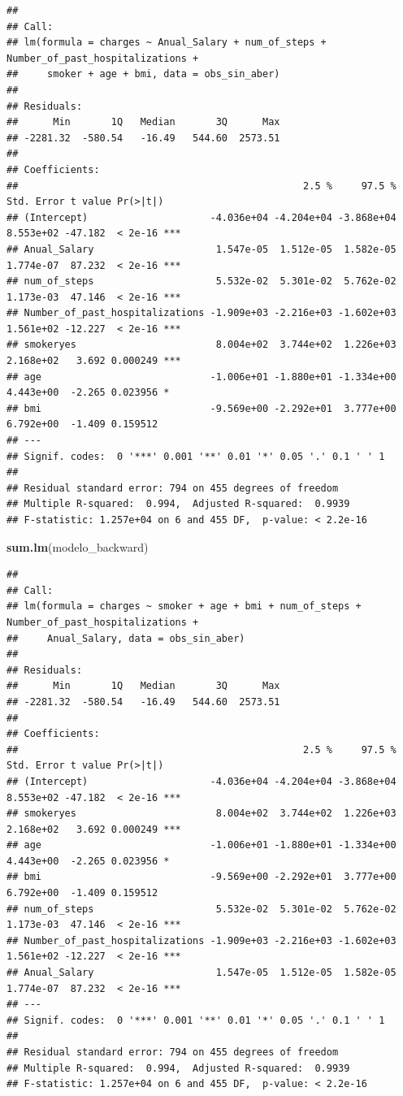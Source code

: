 \documentclass[
]{article}
\newenvironment{Shaded}{\begin{snugshade}}{\end{snugshade}}
\newcommand{\FunctionTok}[1]{\textcolor[rgb]{0.13,0.29,0.53}{\textbf{#1}}}
\newcommand{\NormalTok}[1]{#1}
\begin{document}
\begin{verbatim}
## 
## Call:
## lm(formula = charges ~ Anual_Salary + num_of_steps + Number_of_past_hospitalizations + 
##     smoker + age + bmi, data = obs_sin_aber)
## 
## Residuals:
##      Min       1Q   Median       3Q      Max 
## -2281.32  -580.54   -16.49   544.60  2573.51 
## 
## Coefficients:
##                                                 2.5 %     97.5 % Std. Error t value Pr(>|t|)    
## (Intercept)                     -4.036e+04 -4.204e+04 -3.868e+04  8.553e+02 -47.182  < 2e-16 ***
## Anual_Salary                     1.547e-05  1.512e-05  1.582e-05  1.774e-07  87.232  < 2e-16 ***
## num_of_steps                     5.532e-02  5.301e-02  5.762e-02  1.173e-03  47.146  < 2e-16 ***
## Number_of_past_hospitalizations -1.909e+03 -2.216e+03 -1.602e+03  1.561e+02 -12.227  < 2e-16 ***
## smokeryes                        8.004e+02  3.744e+02  1.226e+03  2.168e+02   3.692 0.000249 ***
## age                             -1.006e+01 -1.880e+01 -1.334e+00  4.443e+00  -2.265 0.023956 *  
## bmi                             -9.569e+00 -2.292e+01  3.777e+00  6.792e+00  -1.409 0.159512    
## ---
## Signif. codes:  0 '***' 0.001 '**' 0.01 '*' 0.05 '.' 0.1 ' ' 1
## 
## Residual standard error: 794 on 455 degrees of freedom
## Multiple R-squared:  0.994,  Adjusted R-squared:  0.9939 
## F-statistic: 1.257e+04 on 6 and 455 DF,  p-value: < 2.2e-16
\end{verbatim}

\begin{Shaded}
\begin{Highlighting}[]
\FunctionTok{sum.lm}\NormalTok{(modelo\_backward)}
\end{Highlighting}
\end{Shaded}

\begin{verbatim}
## 
## Call:
## lm(formula = charges ~ smoker + age + bmi + num_of_steps + Number_of_past_hospitalizations + 
##     Anual_Salary, data = obs_sin_aber)
## 
## Residuals:
##      Min       1Q   Median       3Q      Max 
## -2281.32  -580.54   -16.49   544.60  2573.51 
## 
## Coefficients:
##                                                 2.5 %     97.5 % Std. Error t value Pr(>|t|)    
## (Intercept)                     -4.036e+04 -4.204e+04 -3.868e+04  8.553e+02 -47.182  < 2e-16 ***
## smokeryes                        8.004e+02  3.744e+02  1.226e+03  2.168e+02   3.692 0.000249 ***
## age                             -1.006e+01 -1.880e+01 -1.334e+00  4.443e+00  -2.265 0.023956 *  
## bmi                             -9.569e+00 -2.292e+01  3.777e+00  6.792e+00  -1.409 0.159512    
## num_of_steps                     5.532e-02  5.301e-02  5.762e-02  1.173e-03  47.146  < 2e-16 ***
## Number_of_past_hospitalizations -1.909e+03 -2.216e+03 -1.602e+03  1.561e+02 -12.227  < 2e-16 ***
## Anual_Salary                     1.547e-05  1.512e-05  1.582e-05  1.774e-07  87.232  < 2e-16 ***
## ---
## Signif. codes:  0 '***' 0.001 '**' 0.01 '*' 0.05 '.' 0.1 ' ' 1
## 
## Residual standard error: 794 on 455 degrees of freedom
## Multiple R-squared:  0.994,  Adjusted R-squared:  0.9939 
## F-statistic: 1.257e+04 on 6 and 455 DF,  p-value: < 2.2e-16
\end{verbatim}
\end{document}
